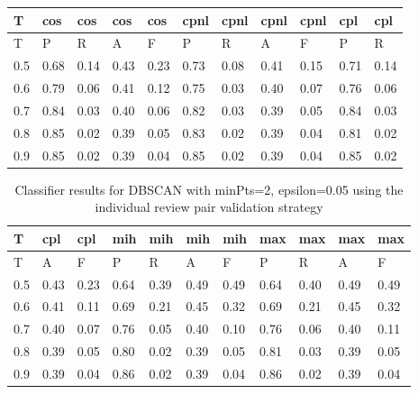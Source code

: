 \begin{center}
\begin{table}[!h]
\centering
\begin{tabular}{|l|l|l|l|l|l|l|l|l|l|l|}
  \hline
T & cos & cos & cos & cos & cpnl & cpnl & cpnl & cpnl & cpl & cpl \\ 
  \hline
T & P & R & A & F & P & R & A & F & P & R \\ 
   \hline
0.5 & 0.68 & 0.14 & 0.43 & 0.23 & 0.73 & 0.08 & 0.41 & 0.15 & 0.71 & 0.14 \\ 
  0.6 & 0.79 & 0.06 & 0.41 & 0.12 & 0.75 & 0.03 & 0.40 & 0.07 & 0.76 & 0.06 \\ 
  0.7 & 0.84 & 0.03 & 0.40 & 0.06 & 0.82 & 0.03 & 0.39 & 0.05 & 0.84 & 0.03 \\ 
  0.8 & 0.85 & 0.02 & 0.39 & 0.05 & 0.83 & 0.02 & 0.39 & 0.04 & 0.81 & 0.02 \\ 
  0.9 & 0.85 & 0.02 & 0.39 & 0.04 & 0.85 & 0.02 & 0.39 & 0.04 & 0.85 & 0.02 \\ 
   \hline
\end{tabular}
\end{table}
\begin{table}[!h]
\centering
\begin{tabular}{|l|l|l|l|l|l|l|l|l|l|l|}
  \hline
T & cpl & cpl & mih & mih & mih & mih & max & max & max & max \\ 
  \hline
T & A & F & P & R & A & F & P & R & A & F \\ 
   \hline
0.5 & 0.43 & 0.23 & 0.64 & 0.39 & 0.49 & 0.49 & 0.64 & 0.40 & 0.49 & 0.49 \\ 
  0.6 & 0.41 & 0.11 & 0.69 & 0.21 & 0.45 & 0.32 & 0.69 & 0.21 & 0.45 & 0.32 \\ 
  0.7 & 0.40 & 0.07 & 0.76 & 0.05 & 0.40 & 0.10 & 0.76 & 0.06 & 0.40 & 0.11 \\ 
  0.8 & 0.39 & 0.05 & 0.80 & 0.02 & 0.39 & 0.05 & 0.81 & 0.03 & 0.39 & 0.05 \\ 
  0.9 & 0.39 & 0.04 & 0.86 & 0.02 & 0.39 & 0.04 & 0.86 & 0.02 & 0.39 & 0.04 \\ 
   \hline
\end{tabular}
\caption{Classifier results for DBSCAN with minPts=2, epsilon=0.05 using the individual review pair validation strategy} 
\label{}
\end{table}\end{center}


